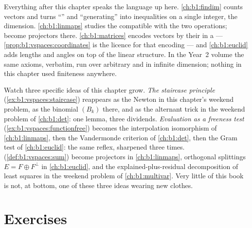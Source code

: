 \begin{remark}
\label{rem:b1:vspaces:whereused}
Everything after this chapter speaks the language  up here.
\cref{ch:b1:findim} counts  vectors and turns ``'' and
``generating'' into inequalities on a single integer, the
dimension. \cref{ch:b1:linmaps} studies the  compatible with
the two operations;  become projectors there.
\cref{ch:b1:matrices} encodes vectors by their  in a
 --- \cref{prop:b1:vspaces:coordinates} is the licence for
that encoding --- and \cref{ch:b1:euclid} adds lengths and angles
on top of the linear structure. In the Year~2 volume the same
axioms, verbatim, run over arbitrary  and in infinite
dimension; nothing in this chapter used finiteness anywhere.
\end{remark}

\begin{remark}
\label{rem:b1:vspaces:threads}
Watch three specific ideas of this chapter grow.
\emph{The staircase principle}
(\cref{ex:b1:vspaces:staircase}) reappears as the Newton 
in this chapter's weekend problem, as the binomial 
$(B_k)$ there, and as the  alternant trick in the
weekend problem of \cref{ch:b1:det}: one lemma, three
 dividends.
\emph{Evaluation as a freeness test}
(\cref{ex:b1:vspaces:functionfree}) becomes the interpolation
isomorphism of \cref{ch:b1:linmaps}, then the Vandermonde
criterion of \cref{ch:b1:det}, then the Gram test of
\cref{ch:b1:euclid}: the same reflex, sharpened three times.
\emph{} (\cref{def:b1:vspaces:sum}) become
projectors in \cref{ch:b1:linmaps}, orthogonal splittings $E =
F \oplus F^\perp$ in \cref{ch:b1:euclid}, and the
explained-plus-residual decomposition of least squares in the
weekend problem of \cref{ch:b1:multivar}. Very little of this
book is not, at bottom, one of these three ideas wearing new
clothes.
\end{remark}

\section{Exercises}

